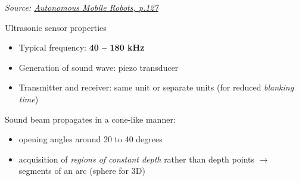 \documentclass[compress]{beamer}
\newcommand{\source}[2]{{\tiny\it Source: \href{#1}{#2}}}
\begin{document}
\begin{frame}[plain]

    \source{https://books.google.co.uk/books?id=4of6AQAAQBAJ&pg=PA127}{Autonomous Mobile Robots, p.127}
\end{frame}

\begin{frame}{Ultrasonic sensor properties}

    \begin{itemize}
        \item Typical frequency: \textbf{40 -- 180 kHz}
        \item Generation of sound wave: piezo transducer
        \item Transmitter and receiver: same unit or separate units (for reduced \emph{blanking time})
    \end{itemize}

    Sound beam propagates in a cone-like manner:

    \begin{itemize}
        \item opening angles around 20 to 40 degrees
        \item acquisition of \emph{regions of constant depth} rather than depth
            points $\rightarrow$ segments of an arc (sphere for 3D)
    \end{itemize}

\end{frame}
\end{document}
